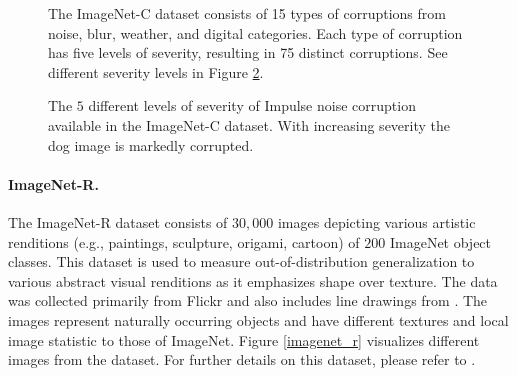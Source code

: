 \documentclass{article}
\begin{document}
\begin{figure}[ht]
\begin{tikzpicture}[picture format/.style={inner sep=2pt,}]
\end{tikzpicture}
\caption{The ImageNet-C dataset consists of 15 types of corruptions from noise, blur, weather, and digital categories. Each type of corruption has five levels of severity,
resulting in 75 distinct corruptions. See different severity levels in Figure \ref{severities}.}
\label{corruption_types}
\end{figure}


\begin{figure}
\centering
{}
\caption{The $5$ different levels of severity of Impulse noise corruption available in the ImageNet-C dataset. With increasing severity the dog image is markedly corrupted.}
\label{severities}
\end{figure}


\paragraph{ImageNet-R.} 
The ImageNet-R dataset \citep{hendrycks2020many} consists of $30,000$ images depicting various
artistic renditions (e.g., paintings, sculpture, origami, cartoon) of $200$ ImageNet object classes. 
This dataset is used to measure out-of-distribution generalization to various abstract visual renditions as it emphasizes shape over texture.
The data was collected primarily from Flickr and also includes line drawings from \citep{Wang2019LearningRG}.
The images represent naturally occurring objects and have different textures and local image statistic to those of ImageNet. Figure \ref{imagenet_r} visualizes different images from the dataset.
For further details on this dataset, please refer to \citep{hendrycks2020many}.
\end{document}
